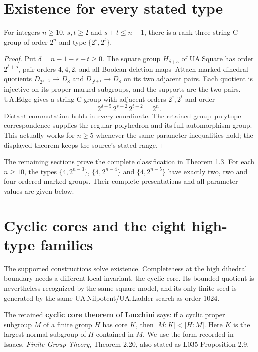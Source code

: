 \section{Existence for every stated type}
\begin{theorem}
For integers $n\ge10$, $s,t\ge2$ and $s+t\le n-1$, there is a
rank-three string C-group of order $2^n$ and type $\{2^s,2^t\}$.
\end{theorem}
\begin{proof}
Put $\delta=n-1-s-t\ge0$. The square group $H_{\delta+5}$ of
UA.Square has order $2^{\delta+5}$, pair orders $4,4,2$, and all
Boolean deletion maps. Attach marked dihedral quotients
$D_{2^{s+1}}\to D_8$ and $D_{2^{t+1}}\to D_8$ on its two adjacent
pairs. Each quotient is injective on its proper marked subgroups, and
the supports are the two pairs. UA.Edge gives a string C-group with
adjacent orders $2^s,2^t$ and order
\[
2^{\delta+5}\,2^{s-2}\,2^{t-2}=2^n.
\]
Distant commutation holds in every coordinate. The retained
group--polytope correspondence supplies the regular polyhedron and its
full automorphism group. This actually works for $n\ge5$ whenever the
same parameter inequalities hold; the displayed theorem keeps the
source's stated range.
\end{proof}

The remaining sections prove the complete classification in Theorem
1.3. For each $n\ge10$, the types $\{4,2^{n-3}\}$,
$\{4,2^{n-4}\}$ and $\{4,2^{n-5}\}$ have exactly two, two and four
ordered marked groups. Their complete presentations and all parameter
values are given below.
\section{Cyclic cores and the eight high-type families}\label{cyclic-cores-and-the-eight-high-type-families}

The supported constructions solve existence. Completeness at the high dihedral boundary needs a different local invariant, the cyclic core. Its bounded quotient is nevertheless recognized by the same square model, and its only finite seed is generated by the same UA.Nilpotent/UA.Ladder search as order 1024.

The retained \textbf{cyclic core theorem of Lucchini} says: if a cyclic proper subgroup \(M\) of a finite group \(H\) has core \(K\), then \(|M:K|<|H:M|\). Here \(K\) is the largest normal subgroup of \(H\) contained in \(M\). We use the form recorded in Isaacs, \emph{Finite Group Theory}, Theorem 2.20, also stated as L035 Proposition 2.9.

